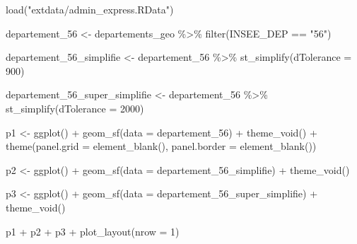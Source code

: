\documentclass[
]{book}
\newenvironment{Shaded}{\begin{snugshade}}{\end{snugshade}}
\newcommand{\AttributeTok}[1]{\textcolor[rgb]{0.77,0.63,0.00}{#1}}
\newcommand{\DecValTok}[1]{\textcolor[rgb]{0.00,0.00,0.81}{#1}}
\newcommand{\FunctionTok}[1]{\textcolor[rgb]{0.00,0.00,0.00}{#1}}
\newcommand{\NormalTok}[1]{#1}
\newcommand{\OtherTok}[1]{\textcolor[rgb]{0.56,0.35,0.01}{#1}}
\newcommand{\SpecialCharTok}[1]{\textcolor[rgb]{0.00,0.00,0.00}{#1}}
\newcommand{\StringTok}[1]{\textcolor[rgb]{0.31,0.60,0.02}{#1}}
\begin{document}
\begin{Shaded}
\begin{Highlighting}[]
\FunctionTok{load}\NormalTok{(}\StringTok{"extdata/admin\_express.RData"}\NormalTok{)}
\end{Highlighting}
\end{Shaded}

\begin{Shaded}
\begin{Highlighting}[]
\NormalTok{departement\_56 }\OtherTok{\textless{}{-}}\NormalTok{ departements\_geo }\SpecialCharTok{\%\textgreater{}\%}
  \FunctionTok{filter}\NormalTok{(INSEE\_DEP }\SpecialCharTok{==} \StringTok{"56"}\NormalTok{)}

\NormalTok{departement\_56\_simplifie }\OtherTok{\textless{}{-}}\NormalTok{ departement\_56 }\SpecialCharTok{\%\textgreater{}\%}
  \FunctionTok{st\_simplify}\NormalTok{(}\AttributeTok{dTolerance =} \DecValTok{900}\NormalTok{)}

\NormalTok{departement\_56\_super\_simplifie }\OtherTok{\textless{}{-}}\NormalTok{ departement\_56 }\SpecialCharTok{\%\textgreater{}\%}
  \FunctionTok{st\_simplify}\NormalTok{(}\AttributeTok{dTolerance =} \DecValTok{2000}\NormalTok{)}
\end{Highlighting}
\end{Shaded}

\begin{Shaded}
\begin{Highlighting}[]
\NormalTok{p1 }\OtherTok{\textless{}{-}} \FunctionTok{ggplot}\NormalTok{() }\SpecialCharTok{+} 
  \FunctionTok{geom\_sf}\NormalTok{(}\AttributeTok{data =}\NormalTok{ departement\_56) }\SpecialCharTok{+} 
  \FunctionTok{theme\_void}\NormalTok{() }\SpecialCharTok{+} 
  \FunctionTok{theme}\NormalTok{(}\AttributeTok{panel.grid =} \FunctionTok{element\_blank}\NormalTok{(), }\AttributeTok{panel.border =} \FunctionTok{element\_blank}\NormalTok{())}

\NormalTok{p2 }\OtherTok{\textless{}{-}} \FunctionTok{ggplot}\NormalTok{() }\SpecialCharTok{+} 
  \FunctionTok{geom\_sf}\NormalTok{(}\AttributeTok{data =}\NormalTok{ departement\_56\_simplifie) }\SpecialCharTok{+}
  \FunctionTok{theme\_void}\NormalTok{()}

\NormalTok{p3 }\OtherTok{\textless{}{-}} \FunctionTok{ggplot}\NormalTok{() }\SpecialCharTok{+} 
  \FunctionTok{geom\_sf}\NormalTok{(}\AttributeTok{data =}\NormalTok{ departement\_56\_super\_simplifie) }\SpecialCharTok{+} 
  \FunctionTok{theme\_void}\NormalTok{()}

\NormalTok{p1 }\SpecialCharTok{+}\NormalTok{ p2 }\SpecialCharTok{+}\NormalTok{ p3 }\SpecialCharTok{+} \FunctionTok{plot\_layout}\NormalTok{(}\AttributeTok{nrow =} \DecValTok{1}\NormalTok{)}
\end{Highlighting}
\end{Shaded}
\end{document}
